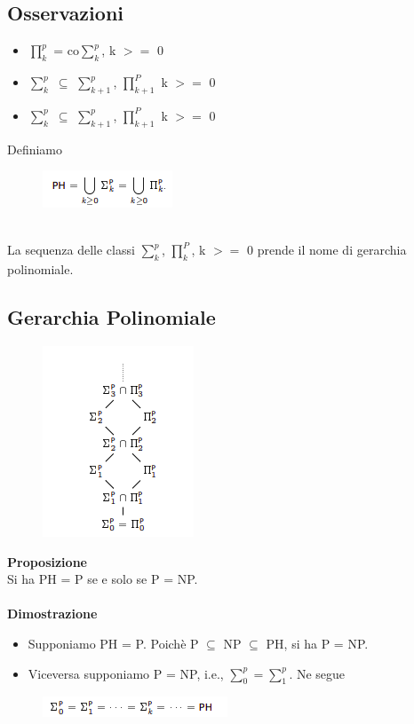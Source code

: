 \subsection{Osservazioni}
\begin{itemize}
    \item $\prod_{k}^{p}$ = co$\sum_{k}^p$, k $>=$ 0
    
    \item $\sum_{k}^p$ $\subseteq$ $\sum_{k+1}^p$, $\prod_{k+1}^{P}$ k $>=$ 0
    
    \item $\sum_{k}^p$ $\subseteq$ $\sum_{k+1}^p$, $\prod_{k+1}^{P}$ k $>=$ 0
\end{itemize}
Definiamo
\begin{figure}[htp]
    \centering
    \includegraphics[scale=0.9]{tesi_stile/img/foto8cap15.png}
\end{figure}
\\La sequenza delle classi $\sum_{k}^p$, $\prod_{k}^{P}$, k $>=$ 0 prende il nome di gerarchia polinomiale.
\newpage
\subsection{Gerarchia Polinomiale}
\begin{figure}[htp]
    \centering
    \includegraphics[scale=0.9]{tesi_stile/img/foto9cap15.png}
\end{figure}
\textbf{Proposizione}\\
Si ha PH = P se e solo se P = NP.\\\\
\textbf{Dimostrazione}\\
\begin{itemize}
    \item Supponiamo PH = P. Poichè P $\subseteq$ NP $\subseteq$ PH, si ha P = NP.
    
    \item Viceversa supponiamo P = NP, i.e., $\sum_{0}^p = \sum_{1}^p$. Ne segue
\end{itemize}
\begin{figure}[htp]
    \centering
    \includegraphics[scale=0.9]{tesi_stile/img/foto10cap15.png}
\end{figure}


